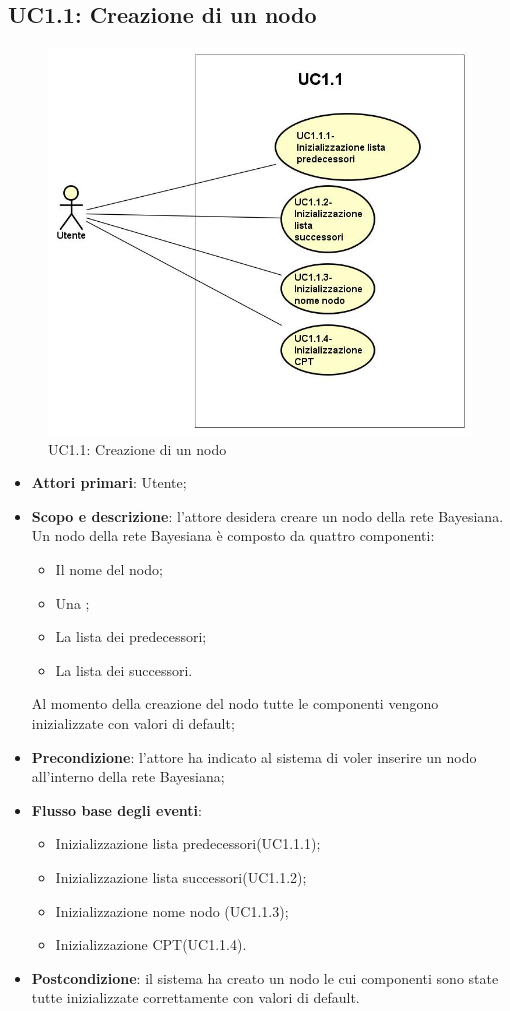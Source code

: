 \subsection{UC1.1: Creazione di un nodo}
\hypertarget{UC1.1}{}  
\begin{figure} [H]
	\centering
	\includegraphics[scale=0.45]{Img/UC1-1} 
	\caption{UC1.1: Creazione di un nodo} \label{} 
\end{figure} 
\begin{itemize} 
	\item{\textbf{Attori primari}: Utente;} 
	\item{\textbf{Scopo e descrizione}: l'attore desidera creare un nodo della rete Bayesiana. Un nodo della rete Bayesiana è composto da quattro componenti: 
		\begin{itemize} 
			\item{Il nome del nodo;} 
			\item{Una ;} 
			\item{La lista dei predecessori;} 
			\item{La lista dei successori.} 
		\end{itemize} 
		Al momento della creazione del nodo tutte le componenti vengono inizializzate con valori di default;} 
	\item{\textbf{Precondizione}: l'attore ha indicato al sistema di voler inserire un nodo all'interno della rete Bayesiana;} 
	\item{\textbf{Flusso base degli eventi}: } 
	\begin{itemize} 
		\item{Inizializzazione lista predecessori(UC1.1.1);} 
		\item{Inizializzazione lista successori(UC1.1.2);} 
		\item{Inizializzazione nome nodo (UC1.1.3);} 
		\item{Inizializzazione CPT(UC1.1.4).} 
	\end{itemize} 
	\item{\textbf{Postcondizione}: il sistema ha creato un nodo le cui componenti sono state tutte inizializzate correttamente con valori di default.} 
\end{itemize} 

